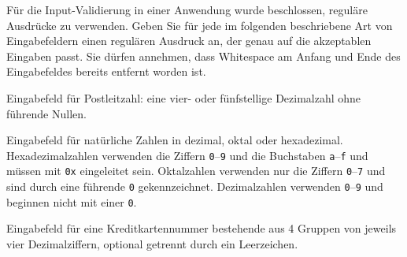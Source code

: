 Für die Input-Validierung in einer Anwendung wurde beschlossen,
reguläre Ausdrücke zu verwenden.
Geben Sie für jede im folgenden beschriebene Art von Eingabefeldern
einen regulären Ausdruck an, der genau auf die akzeptablen Eingaben passt.
Sie dürfen annehmen, dass Whitespace am Anfang und Ende des Eingabefeldes
bereits entfernt worden ist.
\begin{teilaufgaben}
\item Eingabefeld für Postleitzahl: eine vier- oder fünfstellige Dezimalzahl
ohne führende Nullen.
\item Eingabefeld für natürliche Zahlen in dezimal, oktal oder hexadezimal.
Hexadezimalzahlen verwenden die Ziffern \texttt{0}--\texttt{9} und die
Buchstaben \texttt{a}--\texttt{f} und müssen mit \texttt{0x} eingeleitet
sein.
Oktalzahlen verwenden nur die Ziffern \texttt{0}--\texttt{7} und sind
durch eine führende \texttt{0} gekennzeichnet.
Dezimalzahlen verwenden \texttt{0}--\texttt{9} und beginnen nicht mit einer
\texttt{0}.
\item Eingabefeld für eine Kreditkartennummer bestehende aus 4 Gruppen
von jeweils vier Dezimalziffern, optional getrennt durch ein Leerzeichen.
\end{teilaufgaben}

